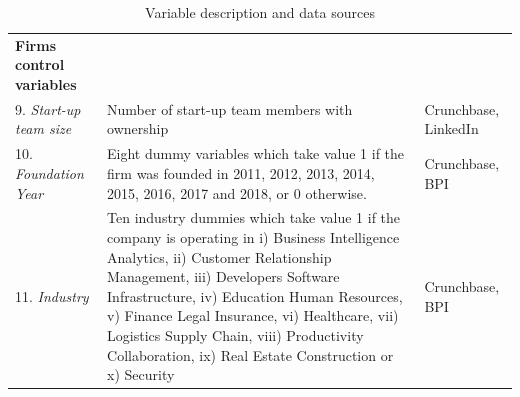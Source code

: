\documentclass[12pt]{article}
\begin{document}
\begin{table} [ht]
\begin{tabularx}{\textwidth}{ p{5cm} p{7cm} p{2.2cm} }
\textbf{Firms control variables}& &\\
9. \textit{Start-up team size} & Number of start-up team members with ownership & Crunchbase, LinkedIn\\
10. \textit{Foundation Year} & Eight dummy variables which take value 1 if the firm was founded in 2011, 2012, 2013, 2014, 2015, 2016, 2017 and 2018, or 0 otherwise. & Crunchbase, BPI\\
11. \textit{Industry} & Ten industry dummies which take value 1 if the company is operating in i) Business Intelligence Analytics, ii) Customer Relationship Management, iii) Developers Software Infrastructure, iv) Education Human Resources, v) Finance Legal Insurance, vi) Healthcare, vii) Logistics Supply Chain, viii) Productivity Collaboration, ix) Real Estate Construction or x) Security & Crunchbase, BPI \\
\cmidrule(r){1-3}
\end{tabularx}
\caption{Variable description and data sources}
\label{table1}
\end{table}
\end{document}
